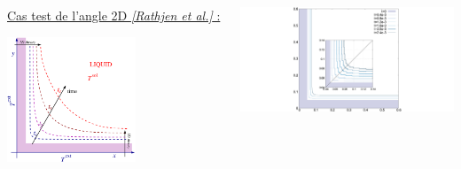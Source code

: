 \documentclass{beamer}
\newcommand{\bib}[1]{{\color{cea_texte!80}\tiny\textit{[#1]}}}
\begin{document}
\begin{frame}
\begin{center}
\begin{table}
\end{table}
\end{center}
\begin{columns}[t]
	\begin{column}{0.39\textwidth}
    \textcolor{cea_rouge}{\underline{Cas test de l'angle 2D \bib{Rathjen et al.} :}}%
\begin{center}
        \includegraphics[width=0.60\textwidth]{Figures/2DStefan.pdf}
        \end{center}
        \end{column}
		\begin{column}{0.59\textwidth}
		\begin{center}
		\vspace{-1.2cm}
        \includegraphics[width=1.2\textwidth]{Figures/Angle2D2_2.pdf}
        \end{center}
        \end{column}
        \end{columns}


\end{frame}
\end{document}
